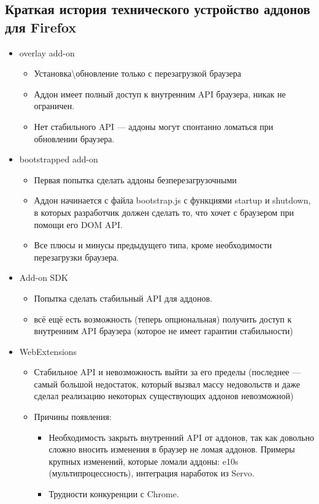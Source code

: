 \documentclass[10pt, a5paper]{article}
\begin{document}
\subsection*{Краткая история технического устройство аддонов для Firefox}

\begin{itemize}
  \item overlay add-on\begin{itemize}
  \item Установка\textbackslash{}обновление только с перезагрузкой браузера
  \item Аддон имеет полный доступ к внутренним API браузера, никак не ограничен.
  \item Нет стабильного API --- аддоны могут спонтанно ломаться при обновлении браузера.
\end{itemize}


  \item bootstrapped add-on\begin{itemize}
  \item Первая попытка сделать аддоны безперезагрузочными
  \item Аддон начинается с файла bootstrap.js с функциями startup и shutdown, в которых разработчик должен сделать то, что хочет с браузером при помощи его DOM API.
  \item Все плюсы и минусы предыдущего типа, кроме необходимости перезагрузки браузера.
\end{itemize}


  \item Add-on SDK\begin{itemize}
  \item Попытка сделать стабильный API для аддонов.
  \item всё ещё есть возможность (теперь опциональная) получить доступ к внутренним API браузера (которое не имеет гарантии стабильности)
\end{itemize}


  \item WebExtensions\begin{itemize}
  \item Стабильное API и невозможность выйти за его пределы (последнее --- самый большой недостаток, который вызвал массу недовольств и даже сделал реализацию некоторых существующих аддонов невозможной)
  \item Причины появления:\begin{itemize}
  \item Необходимость закрыть внутренний API от аддонов, так как довольно сложно вносить изменения в браузер не ломая аддонов. Примеры крупных изменений, которые ломали аддоны: e10s (мультипроцессность), интеграция наработок из Servo.
  \item Трудности конкуренции с Chrome.
\end{itemize}


\end{itemize}


\end{itemize}
\end{document}
